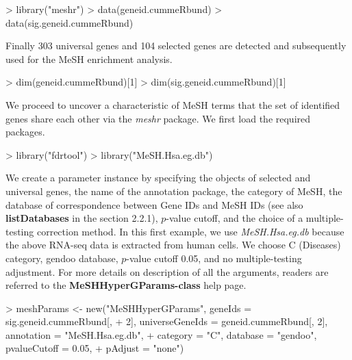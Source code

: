 \documentclass[11pt]{article}
\newcommand{\Rpackage}[1]{{\textit{#1}}}
\begin{document}
\begin{center}
\begin{Schunk}
\begin{Sinput}
> library("meshr")
> data(geneid.cummeRbund)
> data(sig.geneid.cummeRbund)
\end{Sinput}
\end{Schunk}
\end{center}

Finally 303 universal genes and 104 selected genes are detected and subsequently
used for the MeSH enrichment analysis.

\begin{center}
\begin{Schunk}
\begin{Sinput}
> dim(geneid.cummeRbund)[1]
> dim(sig.geneid.cummeRbund)[1]
\end{Sinput}
\end{Schunk}
\end{center}

We proceed to uncover a characteristic of MeSH terms that the set of identified genes share each other via the \Rpackage{meshr} package. We first load the required packages.

\begin{center}
\begin{Schunk}
\begin{Sinput}
> library("fdrtool")
> library("MeSH.Hsa.eg.db")
\end{Sinput}
\end{Schunk}
\end{center}

We create a parameter instance by specifying the objects of selected and universal genes, the name of the annotation package, the category of MeSH, the database of correspondence between Gene IDs and MeSH IDs (see also \textbf{listDatabases} in the section 2.2.1), $p$-value cutoff, and the choice of a multiple-testing correction method.
In this first example, we use \Rpackage{MeSH.Hsa.eg.db} because the above RNA-seq data is extracted from human cells.
We choose C (Diseases) category, gendoo database, $p$-value cutoff 0.05, and no multiple-testing adjustment.
For more details on description of all the arguments, readers are referred to the \textbf{MeSHHyperGParams-class}
help page.

\begin{center}
\begin{Schunk}
\begin{Sinput}
> meshParams <- new("MeSHHyperGParams", geneIds = sig.geneid.cummeRbund[, 
+     2], universeGeneIds = geneid.cummeRbund[, 2], annotation = "MeSH.Hsa.eg.db", 
+     category = "C", database = "gendoo", pvalueCutoff = 0.05, 
+     pAdjust = "none")
\end{Sinput}
\end{Schunk}
\end{center}
\end{document}

